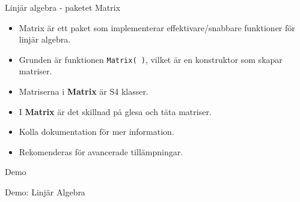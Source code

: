 \documentclass[
  11pt,
  ignorenonframetext,
  handout]{beamer}
\providecommand{\tightlist}{%
  \setlength{\itemsep}{0pt}\setlength{\parskip}{0pt}}
\begin{document}
\begin{frame}{Linjär algebra - paketet Matrix}
\protect{}\label{linjuxe4r-algebra---paketet-matrix}
\begin{itemize}
\tightlist
\item
  Matrix är ett paket som implementerar effektivare/snabbare funktioner
  för linjär algebra.
\item
  Grunden är funktionen \texttt{Matrix( )}, vilket är en konstruktor som
  skapar matriser.
\item
  Matriserna i \textbf{Matrix} är S4 klasser.
\item
  I \textbf{Matrix} är det skillnad på glesa och täta matriser.
\item
  Kolla dokumentation för mer information.
\item
  Rekomenderas för avancerade tillämpningar.
\end{itemize}
\end{frame}

\begin{frame}{Demo}
\protect{}\label{demo-2}
\begin{block}{Demo: Linjär Algebra}
\protect{}\label{demo-linjuxe4r-algebra}
\end{block}
\end{frame}
\end{document}
